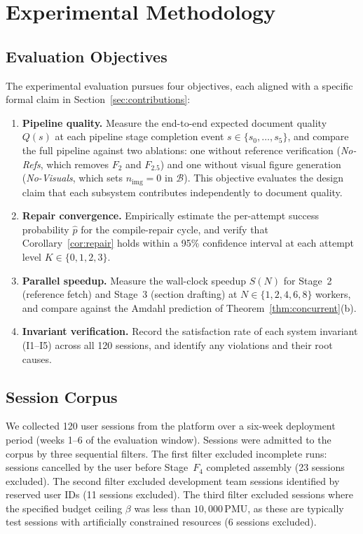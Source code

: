 \section{Experimental Methodology}
\label{sec:experimental}

\subsection{Evaluation Objectives}

The experimental evaluation pursues four objectives, each aligned with a specific
formal claim in Section~\ref{sec:contributions}:

\begin{enumerate}[label=\textbf{E\arabic*.},leftmargin=2.4em]
  \item \textbf{Pipeline quality.}
        Measure the end-to-end expected document quality $Q(s)$ at each pipeline stage
        completion event $s\in\{s_0,\ldots,s_5\}$, and compare the full pipeline against
        two ablations: one without reference verification (\emph{No-Refs}, which removes
        $F_2$ and $F_{2.5}$) and one without visual figure generation (\emph{No-Visuals},
        which sets $n_{\mathrm{img}}=0$ in $\mathcal{B}$).
        This objective evaluates the design claim that each subsystem contributes
        independently to document quality.
  \item \textbf{Repair convergence.}
        Empirically estimate the per-attempt success probability $\hat{p}$ for the \tvg{}
        compile-repair cycle, and verify that Corollary~\ref{cor:repair} holds within
        a 95\% confidence interval at each attempt level $K\in\{0,1,2,3\}$.
  \item \textbf{Parallel speedup.}
        Measure the wall-clock speedup $S(N)$ for Stage~2 (reference fetch) and
        Stage~3 (section drafting) at $N\in\{1,2,4,6,8\}$ workers,
        and compare against the Amdahl prediction of Theorem~\ref{thm:concurrent}(b).
  \item \textbf{Invariant verification.}
        Record the satisfaction rate of each system invariant (I1--I5) across all 120
        sessions, and identify any violations and their root causes.
\end{enumerate}

\subsection{Session Corpus}

We collected 120 user sessions from the \sys{} platform over a six-week deployment
period (weeks 1--6 of the evaluation window).
Sessions were admitted to the corpus by three sequential filters.
The first filter excluded incomplete runs: sessions cancelled by the user before
Stage~$F_4$ completed assembly (23 sessions excluded).
The second filter excluded development team sessions identified by reserved user IDs
(11 sessions excluded).
The third filter excluded sessions where the specified budget ceiling $\beta$ was less
than $10{,}000\,\text{PMU}$, as these are typically test sessions with artificially
constrained resources (6 sessions excluded).


